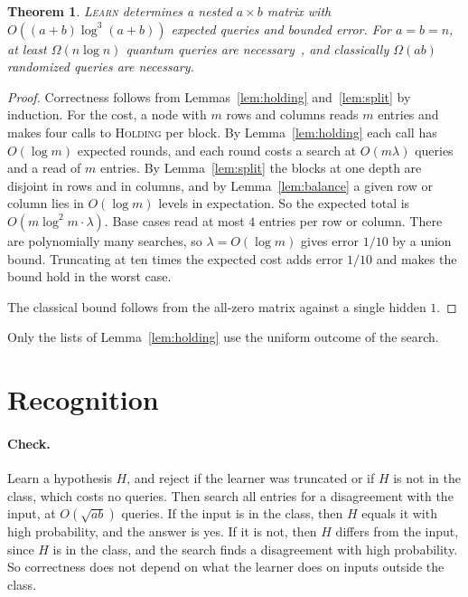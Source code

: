 \documentclass[11pt]{article}
\newtheorem{theorem}{Theorem}[section]
\theoremstyle{remark}
\newcommand{\AlgHold}{\textup{\textsc{Holding}}}
\newcommand{\AlgLearn}{\textup{\textsc{Learn}}}
\begin{document}
\begin{theorem}\label{thm:learn}
\AlgLearn{} determines a nested $a\times b$ matrix with $O((a+b)\log^3(a+b))$ expected queries and bounded error. For $a=b=n$, at least $\Omega(n\log n)$ quantum queries are necessary~\cite{MSZ25}, and classically $\Omega(ab)$ randomized queries are necessary.
\end{theorem}
\begin{proof}
Correctness follows from Lemmas~\ref{lem:holding} and~\ref{lem:split} by induction. For the cost, a node with $m$ rows and columns reads $m$ entries and makes four calls to \AlgHold{} per block. By Lemma~\ref{lem:holding} each call has $O(\log m)$ expected rounds, and each round costs a search at $O(m\lambda)$ queries and a read of $m$ entries. By Lemma~\ref{lem:split} the blocks at one depth are disjoint in rows and in columns, and by Lemma~\ref{lem:balance} a given row or column lies in $O(\log m)$ levels in expectation. So the expected total is $O(m\log^2 m\cdot\lambda)$. Base cases read at most $4$ entries per row or column. There are polynomially many searches, so $\lambda=O(\log m)$ gives error $1/10$ by a union bound. Truncating at ten times the expected cost adds error $1/10$ and makes the bound hold in the worst case.

The classical bound follows from the all-zero matrix against a single hidden $1$.
\end{proof}

Only the lists of Lemma~\ref{lem:holding} use the uniform outcome of the search.

\section{Recognition}\label{sec:recognition}

\paragraph{Check.} Learn a hypothesis $H$, and reject if the learner was truncated or if $H$ is not in the class, which costs no queries. Then search all entries for a disagreement with the input, at $O(\sqrt{ab})$ queries. If the input is in the class, then $H$ equals it with high probability, and the answer is yes. If it is not, then $H$ differs from the input, since $H$ is in the class, and the search finds a disagreement with high probability. So correctness does not depend on what the learner does on inputs outside the class.
\end{document}
